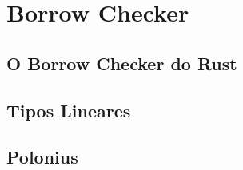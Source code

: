 \chapter{Borrow Checker}
\label{chap4}


\section{O Borrow Checker do Rust}

\section{Tipos Lineares}

\section{Polonius}
